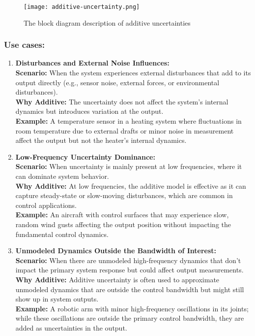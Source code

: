 \begin{figure}[H]
    \centering
    \texttt{[image: additive-uncertainty.png]}
    \caption{The block diagram description of additive uncertainties}
    \label{fig:sensitivity}
\end{figure}

\subsubsection{Use cases:}
\begin{enumerate}
    \item \textbf{Disturbances and External Noise Influences:}\\
    \textbf{Scenario:} When the system experiences external disturbances that add to its output directly (e.g., sensor noise, external forces, or environmental disturbances).\\
\textbf{Why Additive:} The uncertainty does not affect the system's internal dynamics but introduces variation at the output.\\
\textbf{Example:} A temperature sensor in a heating system where fluctuations in room temperature due to external drafts or minor noise in measurement affect the output but not the heater’s internal dynamics.
    \item \textbf{Low-Frequency Uncertainty Dominance:}\\
    \textbf{Scenario:} When uncertainty is mainly present at low frequencies, where it can dominate system behavior.\\
\textbf{Why Additive:} At low frequencies, the additive model is effective as it can capture steady-state or slow-moving disturbances, which are common in control applications.\\
\textbf{Example:} An aircraft with control surfaces that may experience slow, random wind gusts affecting the output position without impacting the fundamental control dynamics.
    \item \textbf{Unmodeled Dynamics Outside the Bandwidth of Interest:}\\
  \textbf{Scenario:} When there are unmodeled high-frequency dynamics that don’t impact the primary system response but could affect output measurements.\\
\textbf{Why Additive:} Additive uncertainty is often used to approximate unmodeled dynamics that are outside the control bandwidth but might still show up in system outputs.\\
\textbf{Example:} A robotic arm with minor high-frequency oscillations in its joints; while these oscillations are outside the primary control bandwidth, they are added as uncertainties in the output.

\end{enumerate}
